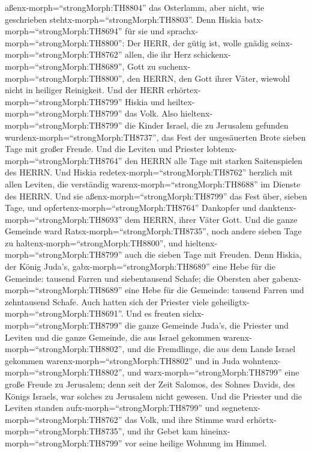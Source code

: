 aßenx-morph=``strongMorph:TH8804'' das Osterlamm, aber nicht, wie
geschrieben stehtx-morph=``strongMorph:TH8803''. Denn Hiskia
batx-morph=``strongMorph:TH8694'' für sie und
sprachx-morph=``strongMorph:TH8800'': Der HERR, der gütig ist, wolle
gnädig seinx-morph=``strongMorph:TH8762''  allen, die ihr
Herz schickenx-morph=``strongMorph:TH8689'', Gott zu
suchenx-morph=``strongMorph:TH8800'', den HERRN, den Gott ihrer Väter,
wiewohl nicht in heiliger Reinigkeit.  Und der HERR
erhörtex-morph=``strongMorph:TH8799'' Hiskia und
heiltex-morph=``strongMorph:TH8799'' das Volk.  Also
hieltenx-morph=``strongMorph:TH8799'' die Kinder Israel, die zu
Jerusalem gefunden wurdenx-morph=``strongMorph:TH8737'', das Fest der
ungesäuerten Brote sieben Tage mit großer Freude. Und die Leviten und
Priester lobtenx-morph=``strongMorph:TH8764'' den HERRN alle Tage mit
starken Saitenspielen des HERRN.  Und Hiskia
redetex-morph=``strongMorph:TH8762'' herzlich mit allen Leviten, die
verständig warenx-morph=``strongMorph:TH8688'' im Dienste des HERRN. Und
sie aßenx-morph=``strongMorph:TH8799'' das Fest über, sieben Tage, und
opfertenx-morph=``strongMorph:TH8764'' Dankopfer und
danktenx-morph=``strongMorph:TH8693'' dem HERRN, ihrer Väter Gott.
 Und die ganze Gemeinde ward
Ratsx-morph=``strongMorph:TH8735'', noch andere sieben Tage zu
haltenx-morph=``strongMorph:TH8800'', und
hieltenx-morph=``strongMorph:TH8799'' auch die sieben Tage mit Freuden.
 Denn Hiskia, der König Juda's,
gabx-morph=``strongMorph:TH8689'' eine Hebe für die Gemeinde: tausend
Farren und siebentausend Schafe; die Obersten aber
gabenx-morph=``strongMorph:TH8689'' eine Hebe für die Gemeinde: tausend
Farren und zehntausend Schafe. Auch hatten sich der Priester viele
geheiligtx-morph=``strongMorph:TH8691''.  Und es freuten
sichx-morph=``strongMorph:TH8799'' die ganze Gemeinde Juda's, die
Priester und Leviten und die ganze Gemeinde, die aus Israel gekommen
warenx-morph=``strongMorph:TH8802'', und die Fremdlinge, die aus dem
Lande Israel gekommen warenx-morph=``strongMorph:TH8802'' und in Juda
wohntenx-morph=``strongMorph:TH8802'',  und
warx-morph=``strongMorph:TH8799'' eine große Freude zu Jerusalem; denn
seit der Zeit Salomos, des Sohnes Davids, des Königs Israels, war
solches zu Jerusalem nicht gewesen.  Und die Priester und
die Leviten standen aufx-morph=``strongMorph:TH8799'' und
segnetenx-morph=``strongMorph:TH8762'' das Volk, und ihre Stimme ward
erhörtx-morph=``strongMorph:TH8735'', und ihr Gebet kam
hineinx-morph=``strongMorph:TH8799'' vor seine heilige Wohnung im
Himmel.


